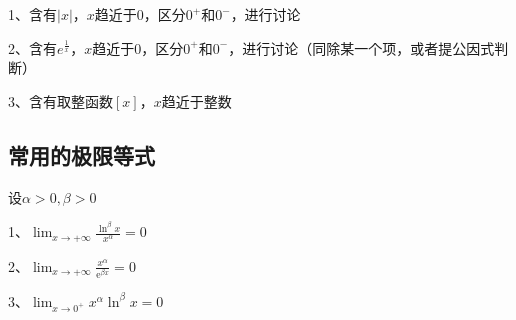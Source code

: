 1、含有$|x|$，$x$趋近于0，区分$0^+$和$0^-$，进行讨论

2、含有$e^{\frac{1}{x}}$，$x$趋近于0，区分$0^+$和$0^-$，进行讨论（同除某一个项，或者提公因式判断）

3、含有取整函数$[x]$，$x$趋近于整数



\subsection{常用的极限等式}

设$\alpha>0, \beta>0$

1、$\lim _{x \rightarrow+\infty} \frac{\ln ^{\beta} x}{x^{\alpha}}=0$

2、$\lim _{x \rightarrow+\infty} \frac{x^{\alpha}}{\mathrm{e}^{\beta x}}=0$

3、$\lim _{x \rightarrow 0^{+}} x^{\alpha} \ln ^{\beta} x=0$


